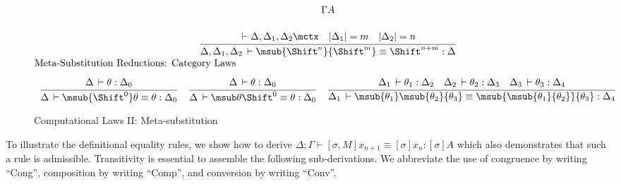 \documentclass[copyright,creativecommons]{eptcs}
\makeatletter
\newcommand{\der}{\,\vdash}
\newcommand{\length}[1]{|#1|}
\newcommand{\ru}[2]{\dfrac{\begin{array}[b]{@{}c@{}} #1 \end{array}}{#2}}
\newcommand{\Shiftby}[1]{\Shift^{#1}}
\newcommand{\abox}[1]{\multicolumn 1 {@{}p{\textwidth}@{}} {#1}}
\makeatother
\begin{document}
\begin{figure}
\[\begin{array}[h]{c}
{     \Gamma A}
\\[1.5em]
\ru{ \der \Delta,\Delta_1,\Delta_2 \mcxt \quad
    \length{\Delta_1} = m \quad 
    \length{\Delta_2} = n
  }{\Delta,\Delta_1,\Delta_2 \der \msub {\Shiftby n}
    {\Shiftby m} \equiv \Shiftby{n+m} : \Delta 
  }
\\[0.75em]
\abox{Meta-Substitution Reductions: Category Laws\hspace{11cm}}
\\[0.75em]
\ru{\Delta \der \theta : \Delta_0
  }{\Delta \der \msub {\Shiftby 0} \theta \equiv \theta : \Delta_0}
\quad
\ru{\Delta \der \theta : \Delta_0
  }{\Delta \der \msub \theta {\Shiftby 0}  \equiv \theta : \Delta_0}
\quad
\ru{\Delta_1 \der \theta_1 : \Delta_2 \quad
     \Delta_2 \der \theta_2 : \Delta_3 \quad
    \Delta_3 \der \theta_3 : \Delta_4 
  }{\Delta_1 \der \msub {\theta_1} \msub {\theta_2}
    {\theta_3} \equiv \msub {\msub {\theta_1}{\theta_2}} {\theta_3} : \Delta_4
   }
\end{array}
\]


  \caption{Computational Laws II: Meta-substitution}
  \label{fig:cl2}
\end{figure}



To illustrate the definitional equality rules, we show how to derive
$\Delta ; \Gamma \vdash [\sigma,M]x_{n+1} \equiv [\sigma]x_n :
[\sigma]A$ which also demonstrates that such a rule is
admissible. Transitivity is essential to assemble the following
sub-derivations. We abbreviate the use of congruence by writing ``Cong'', composition by writing ``Comp'', and conversion by writing ``Conv''.
\end{document}
